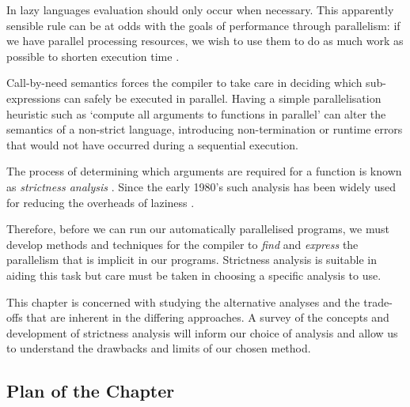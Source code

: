 In lazy languages evaluation should only occur when necessary. This apparently
sensible rule can be at odds with the goals of performance through parallelism:
if we have parallel processing resources, we wish to use them to do as much work
as possible to shorten execution time \citep{tremblay1995impact}.

Call-by-need semantics forces the compiler to take care in deciding which
sub-expressions can safely be executed in parallel.  Having a simple
parallelisation heuristic such as `compute all arguments to functions in
parallel' can alter the semantics of a non-strict language, introducing
non-termination or runtime errors that would not have occurred during a
sequential execution.

The process of determining which arguments are required for a function is known
as \emph{strictness analysis} \citep{mycroft1980theory}. Since the early 1980's
such analysis has been widely used for reducing the overheads of laziness
.

Therefore, before we can run our automatically parallelised programs, we must
develop methods and techniques for the compiler to \emph{find} and
\emph{express} the parallelism that is implicit in our programs. Strictness
analysis is suitable in aiding this task but care must be taken in choosing
a specific analysis to use.

This chapter is concerned with studying the alternative analyses and the
trade-offs that are inherent in the differing approaches. A survey of the
concepts and development of strictness analysis will inform our choice of
analysis and allow us to understand the drawbacks and limits of our chosen
method.

\subsection*{Plan of the Chapter}


